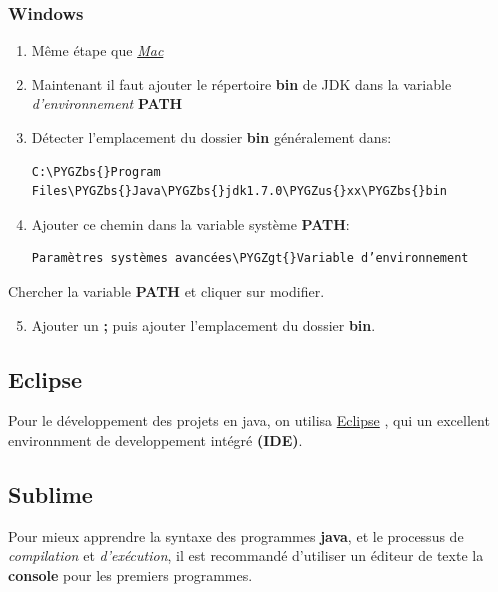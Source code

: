 \documentclass[letterpaper,10pt,english]{sphinxmanual}
\def\PYGZbs{\char`\\}
\def\PYGZus{\char`\_}
\def\PYGZgt{\char`\>}
\begin{document}
\subsubsection{Windows}
\label{installation:windows}\begin{enumerate}
\item {} 
Même étape que {\hyperref[installation:mac]{\emph{Mac}}}

\item {} 
Maintenant il faut ajouter le répertoire \textbf{bin} de JDK dans la variable \emph{d’environnement} \textbf{PATH}

\item {} 
Détecter l'emplacement du dossier \textbf{bin} généralement dans:

\begin{Verbatim}[commandchars=\\\{\}]
C:\PYGZbs{}Program Files\PYGZbs{}Java\PYGZbs{}jdk1.7.0\PYGZus{}xx\PYGZbs{}bin
\end{Verbatim}

\item {} 
Ajouter ce chemin dans la variable système \textbf{PATH}:

\begin{Verbatim}[commandchars=\\\{\}]
Paramètres systèmes avancées\PYGZgt{}Variable d’environnement
\end{Verbatim}

\end{enumerate}

Chercher la variable \textbf{PATH} et cliquer sur modifier.
\begin{enumerate}
\setcounter{enumi}{4}
\item {} 
Ajouter un \textbf{;} puis ajouter l'emplacement du dossier \textbf{bin}.

\end{enumerate}


\subsection{Eclipse}
\label{installation:eclipse}
Pour le développement des projets en java, on utilisa \href{http://www.eclipse.org}{Eclipse} , qui un excellent environnment de developpement intégré \textbf{(IDE)}.


\subsection{Sublime}
\label{installation:sublime}
Pour mieux apprendre la syntaxe des programmes \textbf{java}, et le processus de \emph{compilation} et \emph{d’exécution}, il est recommandé d’utiliser un éditeur de texte la \textbf{console} pour les premiers programmes.
\end{document}
